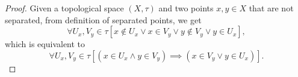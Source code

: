 \documentclass[12pt, letterpaper]{article}
\theoremstyle{definition}
\theoremstyle{remark}
\theoremstyle{definition}
\theoremstyle{plain}
\numberwithin{equation}{section}
\begin{document}
	\begin{proof}
		
		Given a topological space $(X,\tau)$ and two points $x,y\in X$ that are not separated,
		from definition of separated points, we get
		\[ \forall U_x,V_y\in\tau[x\notin U_x\lor x\in V_y\lor y\notin V_y\lor y\in U_x], \]
		which is equivalent to
		\[ \forall U_x,V_y\in\tau[(x\in U_x\land y\in V_y) \implies (x\in V_y\lor y\in U_x)]. \]
				
	\end{proof}
\end{document}
